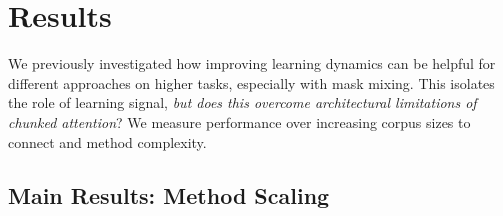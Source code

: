 \section{Results} 


We previously investigated how improving learning dynamics can be helpful for different approaches on higher \cname tasks, especially with mask mixing. This isolates the role of learning signal, \textit{but does this overcome architectural limitations of chunked attention}? We measure performance over increasing corpus sizes to connect \cname and method complexity. 










\subsection{Main Results: \cname Method Scaling}

\label{sec:taskcompresults}

